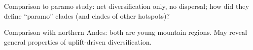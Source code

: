 Comparison to paramo study: net diversification only, no dispersal; how did they define ``paramo'' clades (and clades of other hotspots)?

Comparison with northern Andes: both are young mountain regions. May reveal general properties of uplift-driven diversification.











